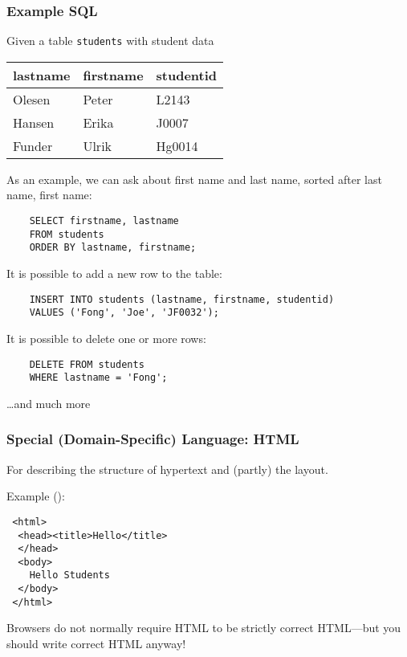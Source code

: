 \documentclass[dvipsnames]{beamer}
\begin{document}
\begin{frame}[fragile]
\frametitle{Example SQL}

Given a table \texttt{students} with student data

\begin{tabular}{|l|l|l|}\hline
lastname & firstname & studentid\\\hline
Olesen & Peter & L2143\\
Hansen & Erika & J0007\\
Funder & Ulrik & Hg0014\\\hline
\end{tabular}

As an example, we can ask about first name and last name, sorted after
last name, first name:

\begin{footnotesize}
\begin{verbatim}
    SELECT firstname, lastname 
    FROM students 
    ORDER BY lastname, firstname;
\end{verbatim}
\end{footnotesize}

It is possible to add a new row to the table:
\begin{footnotesize}
\begin{verbatim}
    INSERT INTO students (lastname, firstname, studentid) 
    VALUES ('Fong', 'Joe', 'JF0032');
\end{verbatim}
\end{footnotesize}

It is possible to delete one or more rows:
\begin{footnotesize}
\begin{verbatim}
    DELETE FROM students 
    WHERE lastname = 'Fong';
\end{verbatim}
\end{footnotesize}
\ldots and much more
\end{frame}


\begin{frame}[fragile]
  \frametitle{Special (Domain-Specific) Language: HTML}
  
   For describing the structure of hypertext and
  (partly) the layout.

  Example ():

\begin{footnotesize}
\begin{verbatim}
 <html>
  <head><title>Hello</title>
  </head>
  <body>
    Hello Students
  </body>
 </html>
\end{verbatim}
\end{footnotesize}

Browsers do not normally require HTML to be strictly correct
HTML---but you should write correct HTML anyway!

\end{frame}
\end{document}
